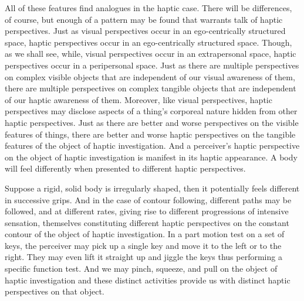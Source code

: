 All of these features find analogues in the haptic case. There will be differences, of course, but enough of a pattern may be found that warrants talk of haptic perspectives. Just as visual perspectives occur in an ego-centrically structured space, haptic perspectives occur in an ego-centrically structured space. Though, as we shall see, while, visual perspectives occur in an extrapersonal space, haptic perspectives occur in a peripersonal space. Just as there are multiple perspectives on complex visible objects that are independent of our visual awareness of them, there are multiple perspectives on complex tangible objects that are independent of our haptic awareness of them. Moreover, like visual perspectives, haptic perspectives may disclose aspects of a thing's corporeal nature hidden from other haptic perspectives. Just as there are better and worse perspectives on the visible features of things, there are better and worse haptic perspectives on the tangible features of the object of haptic investigation. And a perceiver's haptic perspective on the object of haptic investigation is manifest in its haptic appearance. A body will feel differently when presented to different haptic perspectives.

Suppose a rigid, solid body is irregularly shaped, then it potentially feels different in successive grips. And in the case of contour following, different paths may be followed, and at different rates, giving rise to different progressions of intensive sensation, themselves constituting different haptic perspectives on the constant contour of the object of haptic investigation. In a part motion test on a set of keys, the perceiver may pick up a single key and move it to the left or to the right. They may even lift it straight up and jiggle the keys thus performing a specific function test. And we may pinch, squeeze, and pull on the object of haptic investigation and these distinct activities provide us with distinct haptic perspectives on that object. 

